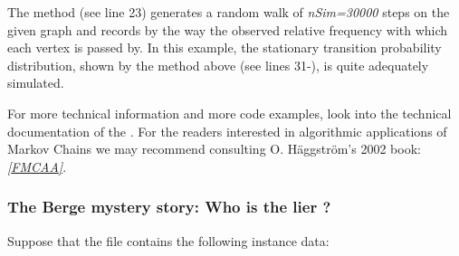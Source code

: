 \documentclass[letterpaper,10pt,english]{sphinxmanual}
\begin{document}
The  method (see line 23) generates a random walk of \emph{nSim=30000} steps on the given graph and records by the way the observed relative frequency with which each vertex is passed by. In this example, the stationary transition probability distribution, shown by the  method above (see lines 31-), is quite adequately simulated.

For more technical information and more code examples, look into the technical documentation of the {\hyperref[techDoc:graphs-label]{\emph{}}}. For the readers interested in algorithmic applications of Markov Chains we may recommend consulting O. Häggström's 2002 book: \label{tutorial:id6}{\hyperref[tutorial:fmcaa]{\emph{{[}FMCAA{]}}}}.


\subsubsection{The Berge mystery story: Who is the lier ?}
\label{tutorial:the-berge-mystery-story-who-is-the-lier}
Suppose that the file  contains the following {\hyperref[techDoc:graphs.Graph]{\emph{}}} instance data:
\end{document}
